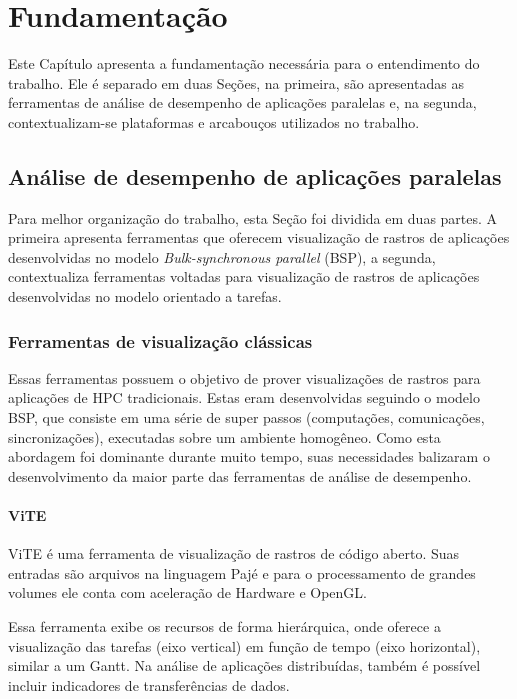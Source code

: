 
\chapter{Fundamentação} \label{ch:fundamentation}

Este Capítulo apresenta a fundamentação necessária para o entendimento do 
trabalho. Ele é separado em duas Seções, na primeira, são apresentadas as 
ferramentas de análise de desempenho de aplicações paralelas e, na segunda,
contextualizam-se plataformas e arcabouços utilizados no trabalho.

\section{Análise de desempenho de aplicações paralelas}

Para melhor organização do trabalho, esta Seção foi dividida em duas partes. A 
primeira apresenta ferramentas que oferecem visualização de rastros de 
aplicações desenvolvidas no modelo \emph{Bulk-synchronous parallel} (BSP), a 
segunda, contextualiza ferramentas voltadas para visualização de rastros de 
aplicações desenvolvidas no modelo orientado a tarefas.

\subsection{Ferramentas de visualização clássicas}

Essas ferramentas possuem o objetivo de prover visualizações de rastros para 
aplicações de HPC tradicionais. Estas eram desenvolvidas seguindo o modelo 
BSP, que consiste em uma série de super passos (computações, comunicações, 
sincronizações), executadas sobre um ambiente homogêneo. Como esta abordagem  
foi dominante durante muito tempo, suas necessidades balizaram 
o desenvolvimento da maior parte das ferramentas de análise de desempenho.

\subsubsection*{ViTE}
ViTE \cite{ref:vite} é uma ferramenta de visualização de rastros de código 
aberto. Suas entradas são arquivos na linguagem Pajé \cite{ref:paje} e para o 
processamento de grandes volumes ele conta com aceleração de Hardware e 
OpenGL. 

Essa ferramenta exibe os recursos de forma hierárquica, onde oferece a 
visualização das tarefas (eixo vertical) em função de tempo (eixo horizontal), 
similar a um Gantt. Na análise de aplicações distribuídas, também é possível 
incluir indicadores de transferências de dados.

